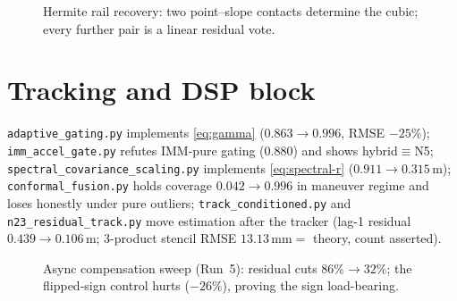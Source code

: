 \documentclass[11pt,oneside]{book}
\begin{document}
\begin{figure}[htbp]
\centering
{}
\caption{Hermite rail recovery: two point--slope contacts determine the
cubic; every further pair is a linear residual vote.}
\label{fig:hermite-fit}
\end{figure}

\section{Tracking and DSP block}
\label{sec:code-tracking}

\texttt{adaptive\_gating.py} implements \cref{eq:gamma} ($0.863\to0.996$,
RMSE $-25\%$); \texttt{imm\_accel\_gate.py} refutes IMM-pure gating
($0.880$) and shows hybrid$\equiv$N5; \texttt{spectral\_covariance\_scaling.py}
implements \cref{eq:spectral-r} ($0.911\to0.315\,\mathrm{m}$);
\texttt{conformal\_fusion.py} holds coverage $0.042\to0.996$ in maneuver
regime and loses honestly under pure outliers;
\texttt{track\_conditioned.py} and \texttt{n23\_residual\_track.py} move
estimation after the tracker (lag-1 residual $0.439\to0.106\,\mathrm{m}$;
3-product stencil RMSE $13.13\,\mathrm{mm}=$ theory, count asserted).

\begin{figure}[htbp]
\centering
{}
\caption{Async compensation sweep (Run~5): residual cuts $86\%\to32\%$;
the flipped-sign control hurts ($-26\%$), proving the sign load-bearing.}
\label{fig:async-sweep}
\end{figure}
\end{document}
